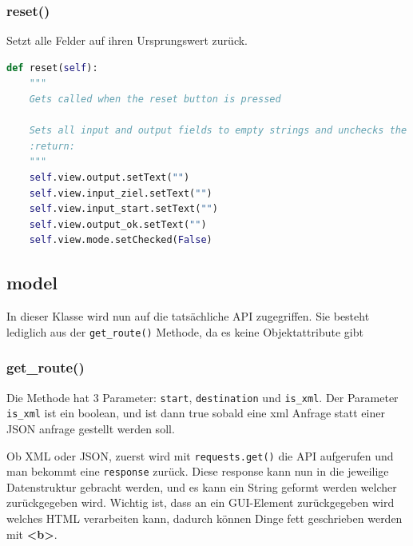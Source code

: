 \subsubsection{reset()}
Setzt alle Felder auf ihren Ursprungswert zurück.

\begin{lstlisting}[language=python]
def reset(self):
	"""
	Gets called when the reset button is pressed
	
	Sets all input and output fields to empty strings and unchecks the box
	:return:
	"""
	self.view.output.setText("")
	self.view.input_ziel.setText("")
	self.view.input_start.setText("")
	self.view.output_ok.setText("")
	self.view.mode.setChecked(False)
\end{lstlisting}

\subsection{model}
In dieser Klasse wird nun auf die tatsächliche API zugegriffen.
Sie besteht lediglich aus der \verb|get_route()| Methode, da es keine Objektattribute gibt

\subsubsection{get\_route()}
Die Methode hat 3 Parameter: \verb|start|, \verb|destination| und \verb|is_xml|. Der Parameter \verb|is_xml| ist ein boolean, und ist dann true sobald eine xml Anfrage statt einer JSON anfrage gestellt werden soll.

Ob XML oder JSON, zuerst wird mit \verb|requests.get()| die API aufgerufen und man bekommt eine \verb|response| zurück. Diese response kann nun in die jeweilige Datenstruktur gebracht werden, und es kann ein String geformt werden welcher zurückgegeben wird. Wichtig ist, dass an ein GUI-Element zurückgegeben wird welches HTML verarbeiten kann, dadurch können Dinge fett geschrieben werden mit \textbf{<b>}.

